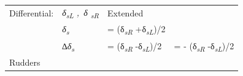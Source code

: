 \documentclass[
]{book}
\begin{document}
\begin{longtable}[]{@{}llll@{}}
\begin{minipage}[t]{0.35\columnwidth}
Differential:\strut
\end{minipage} & \begin{minipage}[t]{0.13\columnwidth}\raggedright
\emph{δ\textsubscript{sL} ,~δ \textsubscript{sR}}\strut
\end{minipage} & \begin{minipage}[t]{0.26\columnwidth}\raggedright
Extended\strut
\end{minipage} & \begin{minipage}[t]{0.14\columnwidth}\raggedright
\strut
\end{minipage}\tabularnewline
\begin{minipage}[t]{0.35\columnwidth}\raggedright
\strut
\end{minipage} & \begin{minipage}[t]{0.13\columnwidth}\raggedright
\emph{δ\textsubscript{s}}\strut
\end{minipage} & \begin{minipage}[t]{0.26\columnwidth}\raggedright
= (δ\emph{\textsubscript{sR}} +δ\emph{\textsubscript{sL}})/2\strut
\end{minipage} & \begin{minipage}[t]{0.14\columnwidth}\raggedright
\strut
\end{minipage}\tabularnewline
\begin{minipage}[t]{0.35\columnwidth}\raggedright
\strut
\end{minipage} & \begin{minipage}[t]{0.13\columnwidth}\raggedright
∆\emph{δ\textsubscript{s}}\strut
\end{minipage} & \begin{minipage}[t]{0.26\columnwidth}\raggedright
= (δ\emph{\textsubscript{sR}} -δ\emph{\textsubscript{sL}})/2\strut
\end{minipage} & \begin{minipage}[t]{0.14\columnwidth}\raggedright
= - (δ\emph{\textsubscript{sR}} -δ\emph{\textsubscript{sL}})/2\strut
\end{minipage}\tabularnewline
\begin{minipage}[t]{0.35\columnwidth}\raggedright
Rudders


\end{minipage}
\end{longtable}
\end{document}
